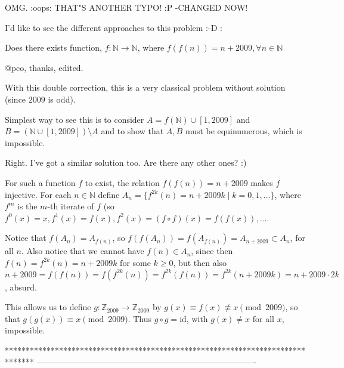 \begin{solution}
	OMG. :oops: THAT"S ANOTHER TYPO! :P -CHANGED NOW!
\end{solution}



\begin{solution}
	\begin{tcolorbox}I'd like to see the different approaches to this problem :-D : 

Does there exists function, $f:\mathbb{N} \longrightarrow \mathbb{N}$, where $f(f(n))=n+2009 ,\forall n \in \mathbb{N}$

@pco, thanks, edited.\end{tcolorbox}
With this double correction, this is a very classical problem without solution (since $2009$ is odd).

Simplest way to see this is to consider $A=f(\mathbb N)\cup[1,2009]$ and $B=(\mathbb N\cup[1,2009])\setminus A$ and to show that $A,B$ must be equinumerous, which is impossible.
\end{solution}



\begin{solution}
	Right. I've got a similar solution too. Are there any other ones? :)
\end{solution}



\begin{solution}
	For such a function $f$ to exist, the relation $f(f(n))= n+2009$ makes $f$ injective. For each $n\in\mathbb{N}$ define $A_n =\{f^{2k}(n) = n + 2009k \mid k=0,1,\ldots\}$, where $f^m$ is the $m$-th iterate of $f$ (so $f^0(x) = x, f^1(x) = f(x), f^2(x) = (f\circ f)(x) = f(f(x)), \ldots$.

Notice that $f(A_n) = A_{f(n)}$, so $f(f(A_n)) = f(A_{f(n)}) = A_{n+2009} \subset A_n$, for all $n$. Also notice that we cannot have $f(n) \in A_n$, since then $f(n) = f^{2k}(n) = n+ 2009k$ for some $k \geq 0$, but then also $n + 2009 = f(f(n)) = f(f^{2k}(n)) = f^{2k}(f(n)) = f^{2k}(n+2009k) = n + 2009\cdot 2k$, absurd. 

This allows us to define $g: \mathbb{Z}_{2009} \to \mathbb{Z}_{2009}$ by $g(x) \equiv f(x) \not \equiv x \pmod {2009}$, so that $g(g(x)) \equiv x \pmod{2009}$. Thus $g\circ g = \textrm{id}$, with $g(x) \neq x$ for all $x$, impossible.
\end{solution}
*******************************************************************************
-------------------------------------------------------------------------------

